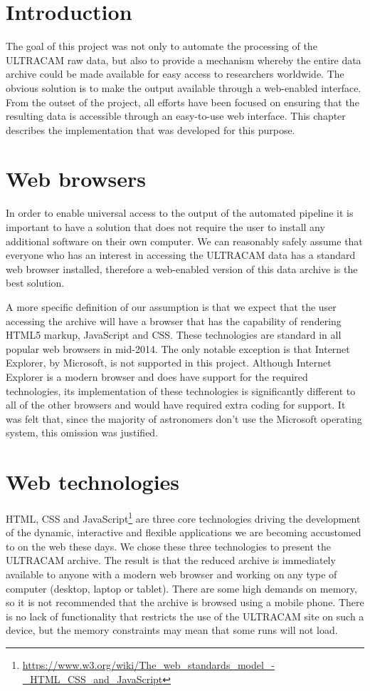 \section{Introduction} 
The goal of this project was not only to automate the processing of the ULTRACAM raw data, but also to provide a mechanism whereby the entire data archive could be made available for easy access to researchers worldwide. The obvious solution is to make the output available through a web-enabled interface. From the outset of the project, all efforts have been focused on ensuring that the resulting data is accessible through an easy-to-use web interface. This chapter describes the implementation that was developed for this purpose. 

\section{Web browsers}
In order to enable universal access to the output of the automated pipeline it is important to have a solution that does not require the user to install any additional software on their own computer. We can reasonably safely assume that everyone who has an interest in accessing the ULTRACAM data has a standard web browser installed, therefore a web-enabled version of this data archive is the best solution. 

A more specific definition of our assumption is that we expect that the user accessing the archive will have a browser that has the capability of rendering HTML5 markup, JavaScript and CSS. These technologies are standard in all popular web browsers in mid-2014. The only notable exception is that Internet Explorer, by Microsoft, is not supported in this project. Although Internet Explorer is a modern browser and does have support for the required technologies, its implementation of these technologies is significantly different to all of the other browsers and would have required extra coding for support. It was felt that, since the majority of astronomers don't use the Microsoft operating system, this omission was justified.  

\section{Web technologies}
HTML, CSS and JavaScript\footnote{\url{https://www.w3.org/wiki/The_web_standards_model_-_HTML_CSS_and_JavaScript}} are three core technologies driving the development of the dynamic, interactive and flexible applications we are becoming accustomed to on the web these days. We chose these three technologies to present the ULTRACAM archive. The result is that the reduced archive is immediately available to anyone with a modern web browser and working on any type of computer (desktop, laptop or tablet). There are some high demands on memory, so it is not recommended that the archive is browsed using a mobile phone. There is no lack of functionality that restricts the use of the ULTRACAM site on such a device, but the memory constraints may mean that some runs will not load.  

